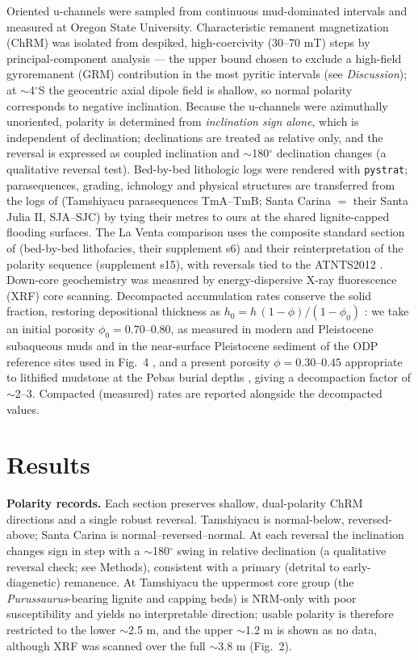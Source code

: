 \documentclass[12pt]{article}
\begin{document}
Oriented u-channels were sampled from continuous mud-dominated intervals and measured at
Oregon State University. Characteristic remanent magnetization (ChRM) was isolated from
despiked, high-coercivity (30--70 mT) steps by principal-component analysis --- the upper
bound chosen to exclude a high-field gyroremanent (GRM) contribution in the most pyritic
intervals (see \textit{Discussion}); at $\sim$4$^\circ$S the geocentric axial dipole field is shallow, so normal
polarity corresponds to negative inclination. Because the u-channels were azimuthally
unoriented, polarity is determined from \emph{inclination sign alone}, which is independent
of declination; declinations are treated as relative only, and the reversal is expressed as
coupled inclination and $\sim$180$^\circ$ declination changes (a qualitative reversal test).
Bed-by-bed lithologic logs were rendered with \texttt{pystrat}; parasequences, grading,
ichnology and physical structures are transferred from the logs of \citet{Gingras2002}
(Tamshiyacu parasequences TmA--TmB; Santa Carina $=$ their Santa Julia II, SJA--SJC) by tying their
metres to ours at the shared lignite-capped flooding surfaces. The La Venta comparison uses the
composite standard section of \citet{MoraRojas2023} (bed-by-bed lithofacies, their supplement s6) and
their reinterpretation of the \citet{Flynn1997} polarity sequence (supplement s15), with reversals
tied to the ATNTS2012 \citep{Hilgen2012}. Down-core geochemistry was measured by energy-dispersive
X-ray fluorescence (XRF) core scanning. Decompacted accumulation rates conserve the solid
fraction, restoring depositional thickness as $h_0 = h\,(1-\phi)/(1-\phi_0)$
\citep{SclaterChristie1980}: we take an initial porosity $\phi_0 = 0.70$--$0.80$, as measured
in modern and Pleistocene subaqueous muds \citep{Meade1966} and in the near-surface Pleistocene
sediment of the ODP reference sites used in Fig.~4 \citep{Mix2003}, and a present porosity
$\phi = 0.30$--$0.45$ appropriate to lithified mudstone at the Pebas burial depths
\citep{SclaterChristie1980}, giving a decompaction factor of $\sim$2--3. Compacted (measured)
rates are reported alongside the decompacted values.

\section*{Results}
\textbf{Polarity records.} Each section preserves shallow, dual-polarity ChRM directions
and a single robust reversal. Tamshiyacu is normal-below, reversed-above; Santa Carina is
normal--reversed--normal. At each reversal the inclination changes sign in step with a
$\sim$180$^\circ$ swing in relative declination (a qualitative reversal check; see Methods), consistent with a
primary (detrital to early-diagenetic) remanence. At Tamshiyacu the uppermost core group (the
\textit{Purussaurus}-bearing lignite and capping beds) is NRM-only with poor susceptibility
and yields no interpretable direction; usable polarity is therefore restricted to the
lower $\sim$2.5 m, and the upper $\sim$1.2 m is shown as no data, although XRF was scanned over
the full $\sim$3.8 m (Fig.~2).
\end{document}
